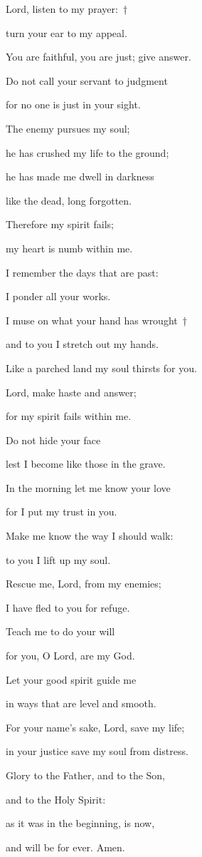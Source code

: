 \noindent Lord, listen to my prayer:~†~\nopagebreak

turn your ear to my appeal.~\GreStar{}~\nopagebreak

You are faithful, you are just; give answer.

\noindent Do not call your servant to judgment~\GreStar{}~\nopagebreak

for no one is just in your sight.

\noindent The enemy pursues my soul;~\GreStar{}~\nopagebreak

he has crushed my life to the ground;

\noindent he has made me dwell in darkness~\GreStar{}~\nopagebreak

like the dead, long forgotten.

\noindent Therefore my spirit fails;~\GreStar{}~\nopagebreak

my heart is numb within me.

\noindent I remember the days that are past:~\GreStar{}~\nopagebreak

I ponder all your works.

\noindent I muse on what your hand has wrought~†~\nopagebreak

and to you I stretch out my hands.~\GreStar{}~\nopagebreak

Like a parched land my soul thirsts for you.

\noindent Lord, make haste and answer;~\GreStar{}~\nopagebreak

for my spirit fails within me.

\noindent Do not hide your face~\GreStar{}~\nopagebreak

lest I become like those in the grave.

\noindent In the morning let me know your love~\GreStar{}~\nopagebreak

for I put my trust in you.

\noindent Make me know the way I should walk:~\GreStar{}~\nopagebreak

to you I lift up my soul.

\noindent Rescue me, Lord, from my enemies;~\GreStar{}~\nopagebreak

I have fled to you for refuge.

\noindent Teach me to do your will~\GreStar{}~\nopagebreak

for you, O Lord, are my God.

\noindent Let your good spirit guide me~\GreStar{}~\nopagebreak

in ways that are level and smooth.

\noindent For your name’s sake, Lord, save my life;~\GreStar{}~\nopagebreak

in your justice save my soul from distress.

\noindent Glory to the Father, and to the Son,~\GreStar{}~\nopagebreak

and to the Holy Spirit:

\noindent as it was in the beginning, is now,~\GreStar{}~\nopagebreak

and will be for ever. Amen.
